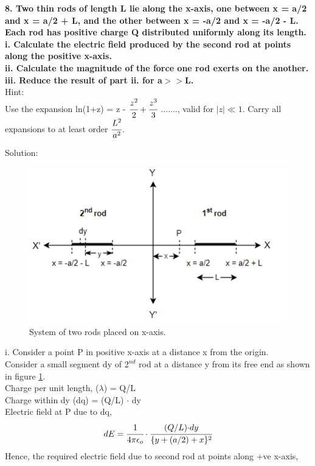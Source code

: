 \newpage
\begin{tcolorbox}
\textbf{8. Two thin rods of length L lie along the x-axis, one between x = a/2 and x = a/2 + L, and the other between x = -a/2 and x = -a/2 - L. Each rod has positive charge Q distributed uniformly along its length.\\
i. Calculate the electric field produced by the second rod at points along the positive x-axis.\\
ii. Calculate the magnitude of the force one rod exerts on the another.\\
iii. Reduce the result of part ii. for a$>>$L.\\}
Hint:\\
Use the expansion ln(1+z) = z - $\cfrac{z^2}{2} + \cfrac{z^3}{3}$ ......., valid for $\mid z\mid \ll1$. Carry all expansions to at least order $\cfrac{L^2}{a^2}$.
\end{tcolorbox}
Solution:\\
\begin{figure}[h]
    \centering
    \includegraphics[scale = 0.75]{figures/elecmag/2rd1.png}
    \caption{System of two rods placed on x-axis.}
    \label{2rd1}
\end{figure}
i. Consider a point P in positive x-axis at a distance x from the origin.\\
Consider a small segment dy of $2^{nd}$ rod at a distance y from its free end as shown in figure \ref{2rd1}.\\
Charge per unit length, ($\lambda$) = Q/L
\vspace{3pt}
\\
Charge within dy (dq) = (Q/L) $\cdot$ dy 
\vspace{3pt}
\\
Electric field at P due to dq, \[dE = \cfrac{1}{4 \pi \epsilon_o} \cdot \cfrac{{(Q/L)\cdot}dy}{\{y+ (a/2) + x\}^2}\]
Hence, the required electric field due to second rod at points along +ve x-axis,
